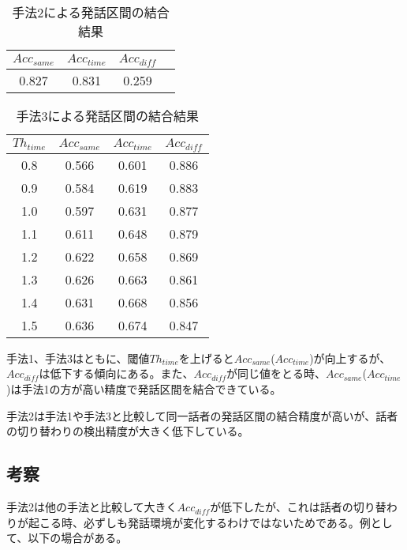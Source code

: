 \begin{table}[H]
\begin{center}
\caption{手法2による発話区間の結合結果 \label{table:result_prob2}}
\begin{tabular}{|c|c|c|c|}
\hline
$Acc_{same}$ & $Acc_{time}$ & $Acc_{diff}$ \\ \hline
0.827 & 0.831    & 0.259    \\ \hline
\end{tabular}
\end{center}
\end{table}

\begin{table}[H]
\begin{center}
\caption{手法3による発話区間の結合結果 \label{table:result_prob3}}
\begin{tabular}{|c||c|c|c|}
\hline
$Th_{time}$   & $Acc_{same}$ & $Acc_{time}$ & $Acc_{diff}$ \\ \hline
0.8 & 0.566    & 0.601    & 0.886    \\ \hline
0.9 & 0.584    & 0.619    & 0.883    \\ \hline
1.0 & 0.597    & 0.631    & 0.877    \\ \hline
1.1 & 0.611    & 0.648    & 0.879    \\ \hline
1.2 & 0.622    & 0.658    & 0.869    \\ \hline
1.3 & 0.626    & 0.663    & 0.861    \\ \hline
1.4 & 0.631    & 0.668    & 0.856    \\ \hline
1.5 & 0.636    & 0.674    & 0.847    \\ \hline
\end{tabular}
\end{center}
\end{table}

手法1、手法3はともに、閾値$Th_{time}$を上げると$Acc_{same}$($Acc_{time}$)が向上するが、$Acc_{diff}$は低下する傾向にある。また、$Acc_{diff}$が同じ値をとる時、$Acc_{same}$($Acc_{time}$)は手法1の方が高い精度で発話区間を結合できている。\par
手法2は手法1や手法3と比較して同一話者の発話区間の結合精度が高いが、話者の切り替わりの検出精度が大きく低下している。

\subsection{考察}
手法2は他の手法と比較して大きく$Acc_{diff}$が低下したが、これは話者の切り替わりが起こる時、必ずしも発話環境が変化するわけではないためである。例として、以下の場合がある。

